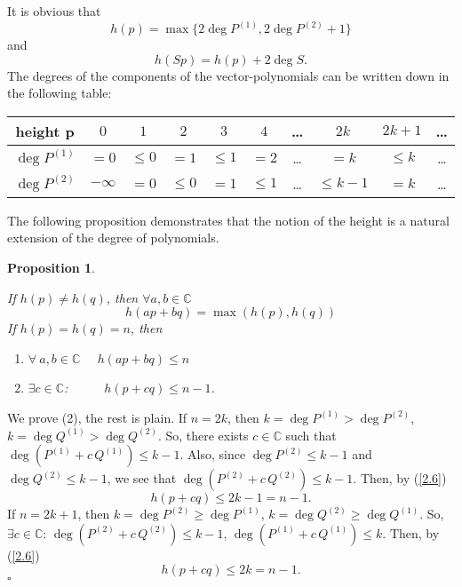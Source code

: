 \documentclass{amsart}
\newtheorem{proposition}[theorem]{Proposition}
\begin{document}
It is obvious that
\begin{equation} \label{2.6}
h(p) = \max \{ 2\deg P^{(1)}, 2\deg P^{(2)}+1 \}
\end{equation}
and
\begin{equation} \label{2.61}
h(Sp)=h(p)+2\deg S.
\end{equation}
 The degrees of the components of the vector-polynomials can be
written down in the following table:

\medskip

\begin{flushleft}
\begin{tabular}{|c|c|c|c|c|c|c|c|c|c}
\hline {height p} & $0$ & $1$ & $2$ & $3$ &
$4$ & \ldots & $2k$ & $2k+1$ & \ldots \\
\hline
$\deg P^{(1)}$ & $=0$ & $\leq 0$ & $=1$ & $\leq 1$ & $=2$ & \ldots & $=k$ & $\leq k$ & \ldots \\
\hline
$\deg P^{(2)}$ & $-\infty$ & $=0$ & $\leq 0$ & $=1$ & $\leq 1$ & \ldots & $\leq k-1$ & $=k$ & \ldots\\
\hline
\end{tabular}
\end{flushleft}

\medskip

The following proposition demonstrates that the notion of the height
is a natural extension of the degree of polynomials.

\begin{proposition} \label{propos2.1}
{\it If $h(p) \ne h(q)$, then $\forall a,b \in \mathbb{C}$
$$ h(ap + bq) = \max(h(p),h(q))
$$
 If $h(p) = h(q) = n$, then
 \begin{enumerate}
    \item    $\forall \ a,b \in \mathbb{C}$ \ \ $h(ap+bq) \leq n$
    \item    $\exists c \in \mathbb{C}$: \ \ \ \ \ $h(p+cq) \leq n-1$.
 \end{enumerate}
}\end{proposition}

 We prove (2), the rest is plain. If $n=2k$,
then $k=\deg P^{(1)}>\deg P^{(2)}$, $k= \deg Q^{(1)}>\deg Q^{(2)}$.
So, there exists $c\in\mathbb{C}$ such that $\deg(P^{(1)} + c \,
Q^{(1)}) \leq k-1$. Also, since $\deg P^{(2)} \leq k-1$ and $\deg
Q^{(2)} \leq k-1$, we see that $\deg(P^{(2)} + c \, Q^{(2)}) \leq
k-1$. Then, by (\ref{2.6})
$$ h(p+cq) \leq 2k-1=n-1.
$$
If $n=2k+1$, then $k=\deg P^{(2)}\ge\deg P^{(1)}$, $k=\deg Q^{(2)}
\ge\deg Q^{(1)}$. So, $\exists c\in\mathbb{C}$: $\deg(P^{(2)}+c\,
Q^{(2)}) \leq k-1$, $\deg(P^{(1)} + c \, Q^{(1)}) \leq k$. Then, by
(\ref{2.6})
$$ h(p+cq) \leq 2k=n-1.
$$
\hfill $\square$
\end{document}
